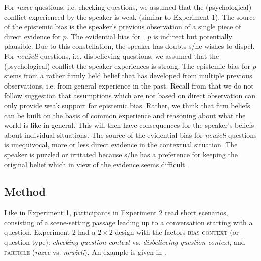 \documentclass[output=paper,colorlinks,citecolor=brown]{langscibook}
\begin{document}
For \textit{razve}-questions, i.e. checking questions, we assumed that the (psychological) conflict experienced by the speaker is weak (similar to Experiment 1). The source of the epistemic bias is the speaker's previous observation of a single piece of direct evidence for $p$. The evidential bias for $\neg p$ is indirect but potentially plausible. Due to this constellation, the speaker has doubts s/he wishes to dispel. For \textit{neuželi}-questions, i.e. disbelieving questions, we assumed that the (psychological) conflict the speaker experiences is strong. The epistemic bias for $p$ stems from a rather firmly held belief that has developed from multiple previous observations, i.e. from general experience in the past. Recall from  that we do not follow   suggestion that assumptions which are not based on direct observation can only provide weak support for epistemic bias. Rather, we think that firm beliefs can be built on the basis of common experience and reasoning about what the world is like in general. This will then have consequences for the speaker's beliefs about individual situations. The source of the evidential bias for \textit{neuželi}-questions is unequivocal, more or less direct evidence in the contextual situation. The speaker is puzzled or irritated because s/he has a preference for keeping the original belief which in view of the evidence seems difficult.

\subsection{Method}\label{sec:05:5:1}
Like in Experiment 1, participants in Experiment 2 read short scenarios, consisting of a scene-setting passage leading up to a conversation starting with a question. Experiment 2 had a $2\times2$ design with the factors \textsc{bias context} (or question type): \textit{checking question context} vs. \textit{disbelieving question context}, and \textsc{particle} (\textit{razve} vs. \textit{neuželi}). An example is given in .
\end{document}
